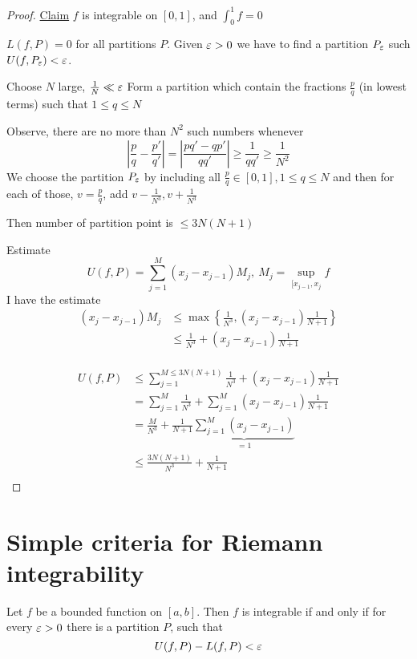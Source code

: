 \begin{proof}
  \underline{Claim} $f$ is integrable on $[0, 1]$, and $\int_{0}^{1} f =0$

  $L(f, P) = 0$ for all partitions $P$. Given $\varepsilon > 0$ we have to find a partition $P_\varepsilon$ such $U(f, P_\varepsilon) < \varepsilon$.

  Choose $N$ large, $\frac{1}{N} \ll \varepsilon$
  Form a partition which contain the fractions $\frac{p}{q}$ (in lowest terms) such that $1 \le q \le N$
  
  Observe, there are no more than $N^2$ such numbers whenever
  $$\left|\frac{p}{q} - \frac{p'}{q'}\right| = \left|\frac{pq'-qp'}{qq'}\right| \ge \frac{1}{qq'} \ge \frac{1}{N^2}$$
  We choose the partition $P_\varepsilon$ by including all $\frac{p}{q} \in [0, 1], 1 \le q \le N$ 
  and then for each of those, $v = \frac{p}{q}$, add $v - \frac{1}{N^3}, v+ \frac{1}{N^3}$

  Then number of partition point is $\le 3N(N+1)$

  Estimate $$U(f, P) = \sum_{j=1}^{M} (x_j - x_{j-1})M_j,\ M_j = \sup_{[x_{j-1}, x_j}f$$
  I have the estimate
  \begin{align*}
  (x_j - x_{j-1})M_j &\leq \max\left\{\frac{1}{N^3}, (x_j - x_{j-1})\frac{1}{N + 1}\right\} \\
  &\leq \frac{1}{N^3} + (x_j - x_{j-1})\frac{1}{N+1} \\
  \end{align*}

  \begin{align*}
    U(f, P) &\leq \sum_{j=1}^{M \leq 3N(N+1)} \frac{1}{N^3} + (x_j - x_{j-1})\frac{1}{N+1}\\
    &= \sum_{j=1}^{M} \frac{1}{N^3} + \sum_{j=1}^{M} (x_j - x_{j-1})\frac{1}{N+1}\\
    &= \frac{M}{N^3} + \frac{1}{N+1}\underbrace{\sum_{j=1}^{M} (x_j - x_{j-1})}_{= 1}\\
    &\leq \frac{3N(N+1)}{N^3} + \frac{1}{N+1}\\
  \end{align*}
\end{proof}

\section{Simple criteria for Riemann integrability}

\begin{theorem*}
  Let $f$ be a bounded function on $[a, b]$. Then $f$ is integrable if and only if for every $\varepsilon > 0$
  there is a partition $P$, such that $$U(f, P) - L(f, P) < \varepsilon$$
\end{theorem*}

